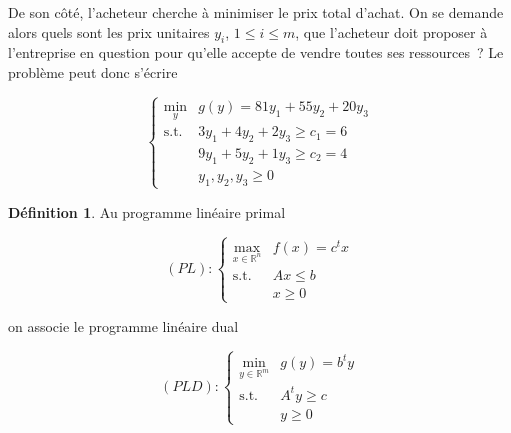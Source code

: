 \documentclass[a4paper,12pt,openany]{book}
\theoremstyle{plain}
\theoremstyle{definition}
\newtheorem{definition}[theorem]{Définition}
\theoremstyle{remark}
\theoremstyle{nbstyle}
\begin{document}
	De son côté, l'acheteur cherche à minimiser le prix total d'achat. On se demande alors quels sont les prix unitaires $y_{i}$, $1 \leq i \leq m$, que l'acheteur doit proposer à l'entreprise en question pour qu'elle accepte de vendre toutes ses ressources~? Le problème peut donc s'écrire
	
	\[
	\left\{
	\begin{array}{ll}
	\displaystyle\min_{y} & g(y)=81 y_{1}+55 y_{2}+20 y_{3} \\
	\text{s.t.} & 3 y_{1}+4 y_{2}+2 y_{3} \geq c_{1}=6 \\
	& 9 y_{1}+5 y_{2}+1 y_{3} \geq c_{2}=4 \\
	& y_{1}, y_{2}, y_{3} \geq 0
	\end{array}
	\right.
	\]
	
	\begin{definition}
		Au programme linéaire primal
		
		\[
		(PL):\left\{
		\begin{array}{ll}
		\displaystyle\max_{x \in \mathbb{R}^{n}} & f(x)=c^{t} x \\
		\text{s.t.} & A x \leq b \\
		& x \geq 0
		\end{array}
		\right.
		\]
		
		on associe le programme linéaire dual
		
		\[
		(PLD):\left\{
		\begin{array}{ll}
		\displaystyle\min_{y \in \mathbb{R}^{m}} & g(y)=b^{t} y \\
		\text{s.t.} & A^{t} y \geq c \\
		& y \geq 0
		\end{array}
		\right.
		\]
	\end{definition}
	
\end{document}
